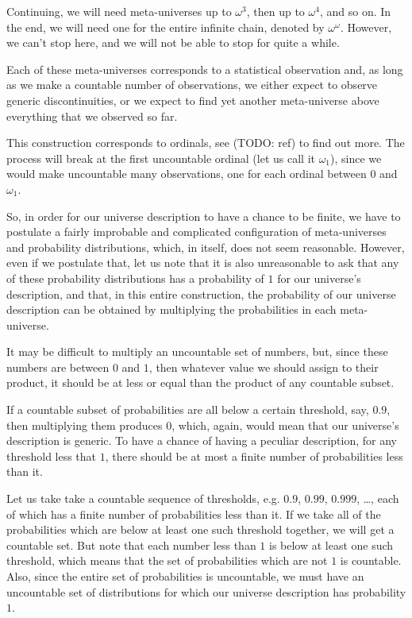 \documentclass[a4paper
,draft
]{article}
\begin{document}
Continuing, we will need meta-universes up to $\omega^3$, then up to
$\omega^4$, and so on.
In the end, we will need one for the entire
infinite chain, denoted by $\omega^\omega$.
However, we can't stop here, and we will not be able to stop for quite a while.

Each of these meta-universes corresponds to a statistical observation and,
as long as we make a countable number of observations, we either expect to
observe generic discontinuities, or we expect to find yet another meta-universe
above everything that we observed so far.

This construction corresponds to ordinals, see (TODO: ref) to find out more.
The process will break at the first uncountable ordinal (let us call it
$\omega_1$), since we would make
uncountable many observations, one for each ordinal between $0$ and $\omega_1$.

So, in order for our universe description to have a chance to be finite,
we have to postulate a fairly improbable and complicated configuration
of meta-universes and probability distributions, which,
in itself, does not seem reasonable.
However, even if we postulate that, let us note that it is also unreasonable
to ask that any of these probability distributions has a probability of $1$
for our universe's description, and that, in this entire construction,
the probability of our universe description can be obtained by multiplying the
probabilities in each meta-universe.

It may be difficult to multiply an uncountable set of numbers, but,
since these numbers are between $0$ and $1$, then whatever value we should
assign to their product,
it should be at less or equal than the product of any countable subset.

If a countable subset of probabilities are all below a certain threshold,
say, $0.9$, then multiplying them produces $0$, which, again, would mean
that our universe's description is generic. To have a chance of having
a peculiar description, for any threshold less that $1$, there should be at
most a finite number of probabilities less than it.

Let us take take a countable sequence of thresholds, e.g.
$0.9$, $0.99$, $0.999$, \dots, each of which has a finite number of
probabilities less than it.
If we take all of the probabilities which are below at least
one such threshold together, we will get a countable set.
But note that each number less than $1$ is below at least one such threshold,
which means that the set of
probabilities which are not $1$ is countable.
Also, since the entire set of
probabilities is uncountable, we must have an uncountable set of distributions
for which our universe description has probability $1$.
\end{document}
